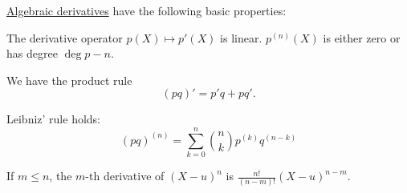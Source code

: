 \begin{proposition}\label{thm:def:algebraic_derivative}
  \hyperref[def:algebraic_derivative]{Algebraic derivatives} have the following basic properties:
  \begin{thmenum}
     The derivative operator \( p(X) \mapsto p'(X) \) is linear.
     \( p^{(n)}(X) \) is either zero or has degree \( \deg p - n \).

     We have the product rule
    \begin{equation}\label{eq:thm:def:algebraic_derivative/product}
      (pq)' = p'q + pq'.
    \end{equation}

     Leibniz' rule holds:
    \begin{equation}\label{eq:thm:def:algebraic_derivative/leibniz}
      (pq)^{(n)} = \sum_{k=0}^n \binom n k p^{(k)} q^{(n-k)}
    \end{equation}

     If \( m \leq n \), the \( m \)-th derivative of \( (X - u)^n \) is \( \tfrac {n!} {(n-m)!} (X - u)^{n-m} \).
  \end{thmenum}
\end{proposition}
